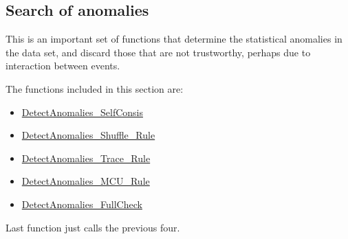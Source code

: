 \subsection{Search of anomalies}\label{Subsec:SearchOfAnomalies}

This is an important set of functions that determine the statistical anomalies in the data set, and discard those that are not trustworthy, perhaps due to interaction between events. 

The functions included in this section are:

\begin{itemize}
	\item  \hyperref[Fun:DetectAnomaliesSelfConsis]{DetectAnomalies\_SelfConsis}
	\item  \hyperref[Fun:DetectAnomaliesShuffleRule]{DetectAnomalies\_Shuffle\_Rule}
	\item  \hyperref[Fun:DetectAnomaliesTraceRule]{DetectAnomalies\_Trace\_Rule}
	\item  \hyperref[Fun:DetectAnomaliesMCURule]{DetectAnomalies\_MCU\_Rule}
	\item  \hyperref[Fun:DetectAnomaliesFullCheck]{DetectAnomalies\_FullCheck}
\end{itemize}

Last function just calls the previous four.

